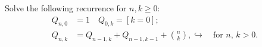 \documentclass{article}
\begin{document}
Solve the following recurrence for $ n,k\geq 0 $:
\begin{align*}
Q_{n,0} &= 1 \quad Q_{0,k} = [k=0]; \\
Q_{n,k} &= Q_{n-1,k}+Q_{n-1,k-1}+\binom{n}{k},
↪ \quad\text{for $n$, $k>0$.}
\end{align*}
\end{document}
